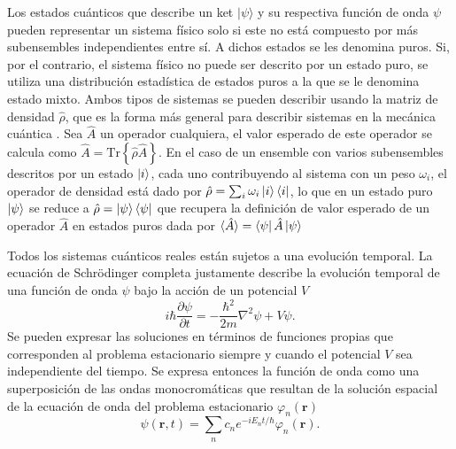 Los estados cuánticos que describe un ket $\vert\psi\rangle$ y su respectiva función de onda $\psi$ pueden representar un sistema físico solo si este no está compuesto por más subensembles independientes entre sí. A dichos estados se les denomina puros. Si, por el contrario, el sistema físico no puede ser descrito por un estado puro, se utiliza una distribución estadística de estados puros a la que se le denomina estado mixto. Ambos tipos de sistemas se pueden describir usando la matriz de densidad $\hat{\rho}$, que es la forma más general para describir sistemas en la mecánica cuántica \cite{Pena}. Sea $\hat{A}$ un operador cualquiera, el valor esperado de este operador se calcula como $\hat{A} = \text{Tr}\left\{ \hat{\rho} \hat{A} \right\}$. En el caso de un ensemble con varios subensembles descritos por un estado $\ket{i}$, cada uno contribuyendo al sistema con un peso $\omega_i$, el operador de densidad está dado por $\hat{\rho} = \sum_i \omega_i \ket{i} \bra{i}$, lo que en un estado puro $\ket{\psi}$ se reduce a $\hat{\rho} = \ket{\psi}\bra{\psi}$ que recupera la definición de valor esperado de un operador $\hat{A}$ en estados puros dada por $\langle\hat{A}\rangle = \bra{\psi}\hat{A}\ket{\psi}$

Todos los sistemas cuánticos reales están sujetos a una evolución temporal. La ecuación de Schrödinger completa justamente describe la evolución temporal de una función de onda $\psi$ bajo la acción de un potencial $V$
\begin{equation}
  i\hbar\frac{\partial \psi}{\partial t} = -\frac{\hbar^2}{2m}\nabla^2 \psi + V\psi.
\end{equation}
Se pueden expresar las soluciones en términos de funciones propias que corresponden al problema estacionario siempre y cuando el potencial $V$ sea independiente del tiempo. Se expresa entonces la función de onda como una superposición de las ondas monocromáticas que resultan de la solución espacial de la ecuación de onda del problema estacionario $\varphi_n(\mathbf{r})$
\begin{equation}
  \psi(\mathbf{r}, t) = \sum_n c_n e^{-iE_n t/\hbar}\varphi_n(\mathbf{r}).
\end{equation}

